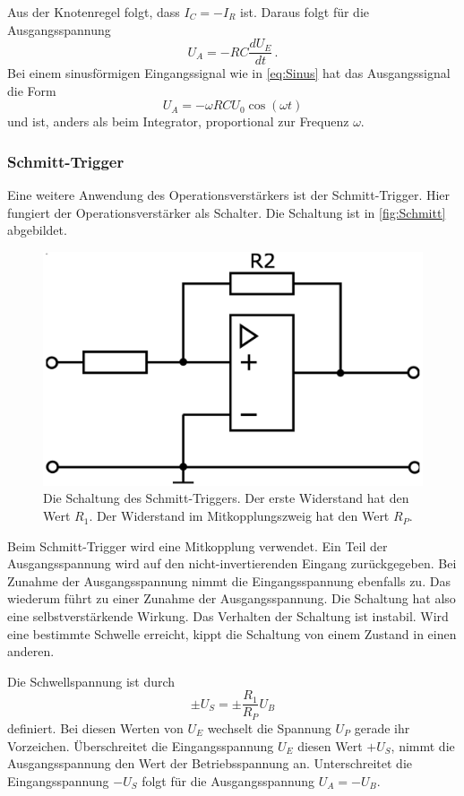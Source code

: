 Aus der Knotenregel folgt, dass $I_C = - I_R$ ist. Daraus folgt für die Ausgangsspannung
\begin{equation}
    U_A = - R C \frac{d U_E}{dt} \, .
    \label{eq:Differenzierer}
\end{equation}
Bei einem sinusförmigen Eingangssignal wie in \autoref{eq:Sinus} hat das Ausgangssignal die Form 
\begin{equation*}
    U_A = - \omega R C U_0 \cos(\omega t)
\end{equation*}
und ist, anders als beim Integrator, proportional zur Frequenz $\omega$.

\subsubsection{Schmitt-Trigger}
Eine weitere Anwendung des Operationsverstärkers ist der Schmitt-Trigger. Hier fungiert der Operationsverstärker als Schalter. Die Schaltung ist in \autoref{fig:Schmitt} abgebildet.

\begin{figure}
    \centering
    \includegraphics[width=0.7\linewidth]{./figures/4_Schmitt.png}
    \caption{Die Schaltung des Schmitt-Triggers. Der erste Widerstand hat den Wert $R_1$. Der Widerstand im Mitkopplungszweig hat den Wert $R_P$. \cite{Anleitung}} %
    \label{fig:Schmitt}
\end{figure}

Beim Schmitt-Trigger wird eine Mitkopplung verwendet. Ein Teil der Ausgangsspannung wird auf den nicht-invertierenden Eingang zurückgegeben. Bei Zunahme der Ausgangsspannung nimmt die Eingangsspannung ebenfalls zu. Das wiederum führt zu einer Zunahme der Ausgangsspannung. Die Schaltung hat also eine selbstverstärkende Wirkung.
Das Verhalten der Schaltung ist instabil. Wird eine bestimmte Schwelle erreicht, kippt die Schaltung von einem Zustand in einen anderen.

Die Schwellspannung ist durch 
\begin{equation*}
    \pm U_S = \pm \frac{R_1}{R_P} U_B
    \label{eq:Schwelle}
\end{equation*}
definiert. Bei diesen Werten von $U_E$ wechselt die Spannung $U_P$ gerade ihr Vorzeichen.
Überschreitet die Eingangsspannung $U_E$ diesen Wert $+ U_S$, nimmt die Ausgangsspannung den Wert der Betriebsspannung an. Unterschreitet die Eingangsspannung $- U_S$ folgt für die Ausgangsspannung $U_A = - U_B$.


